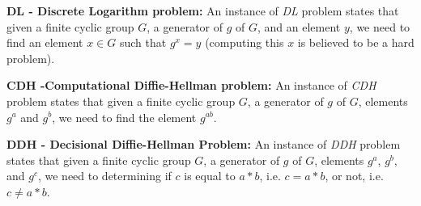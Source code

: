      
      \textbf{DL - Discrete Logarithm problem:} 
      An instance of \textit{DL} problem states that given a finite cyclic group $G$, a generator of $g$ of $G$, and 
      an element $y$,  we need to find an element $x \in G$ such that $g^{x} = y$ (computing this $x$ is believed to be a 
      hard problem).
      
      
      \textbf{CDH -Computational Diffie-Hellman problem:}
      An instance of \textit{CDH} problem   
      states that given a finite cyclic group $G$, a generator of $g$ of $G$, 
      elements $g^{a}$ and $g^{b}$,  we need to find the element $g^{ab}$.
      
      
      \textbf{DDH - Decisional Diffie-Hellman Problem:}
      An instance of \textit{DDH} problem states that given a finite cyclic group $G$, a generator of $g$ of $G$,
      elements $g^{a}$, $g^{b}$, and $g^{c}$,  we need to determining if $c$ is equal to $a * b$, i.e. $c = a * b$, or not, i.e.  $c \neq a * b$.
      
           	 
     
